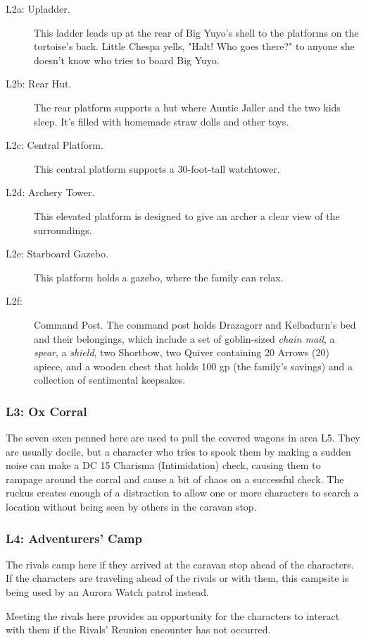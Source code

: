 \documentclass[10pt,a4paper,twoside,bg=print,twocolumn,openany,nodeprecatedcode]{dndbook}
\begin{document}
\begin{description}
\item[L2a: Upladder.]
This ladder leads up at the rear of Big Yuyo's shell to the platforms on the tortoise's back. Little Chespa yells, "Halt! Who goes there?" to anyone she doesn't know who tries to board Big Yuyo.
\item[L2b: Rear Hut.]
The rear platform supports a hut where Auntie Jaller and the two kids sleep. It's filled with homemade straw dolls and other toys.
\item[L2c: Central Platform.]
This central platform supports a 30-foot-tall watchtower.
\item[L2d: Archery Tower.]
This elevated platform is designed to give an archer a clear view of the surroundings.
\item[L2e: Starboard Gazebo.]
This platform holds a gazebo, where the family can relax.
\item[L2f:]
Command Post. The command post holds Drazagorr and Kelbadurn's bed and their belongings, which include a set of goblin-sized \textit{chain mail}, a \textit{spear}, a \textit{shield}, two Shortbow, two Quiver containing 20 Arrows (20) apiece, and a wooden chest that holds 100 gp (the family's savings) and a collection of sentimental keepsakes.
\end{description}

\subsubsection{L3: Ox Corral}
The seven oxen penned here are used to pull the covered wagons in area L5. They are usually docile, but a character who tries to spook them by making a sudden noise can make a DC 15 Charisma (Intimidation) check, causing them to rampage around the corral and cause a bit of chaos on a successful check. The ruckus creates enough of a distraction to allow one or more characters to search a location without being seen by others in the caravan stop.

\subsubsection{L4: Adventurers' Camp}
The rivals camp here if they arrived at the caravan stop ahead of the characters. If the characters are traveling ahead of the rivals or with them, this campsite is being used by an Aurora Watch patrol instead.

Meeting the rivals here provides an opportunity for the characters to interact with them if the Rivals' Reunion encounter has not occurred.
\end{document}
